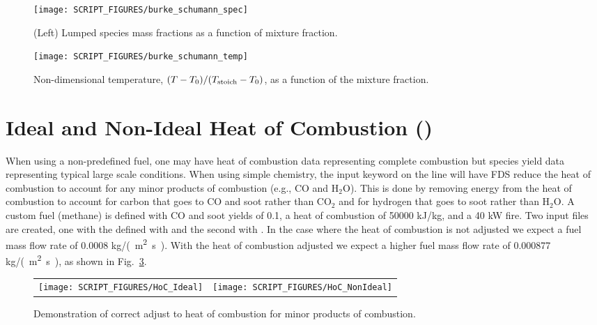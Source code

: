 \documentclass[11pt]{book}
\begin{document}
\begin{figure}[!ht]
\centering
\texttt{[image: SCRIPT\_FIGURES/burke\_schumann\_spec]}
\caption[Mixture fraction state relations for species ()]{(Left) Lumped species mass fractions as a function of mixture fraction.}
\label{fig:burke_schumann_spec}
\end{figure}

\begin{figure}[!ht]
\centering
\texttt{[image: SCRIPT\_FIGURES/burke\_schumann\_temp]}
\caption[Mixture fraction state relations for temperature ()]{Non-dimensional temperature, $(T-T_0)/(T_{\rm stoich} - T_0)$, as a function of the mixture fraction.}
\label{fig:burke_schumann_temp}
\end{figure}


\section{Ideal and Non-Ideal Heat of Combustion ()}
\label{HoC}
\label{HoC_Ideal}
\label{HoC_NonIdeal}

When using a non-predefined fuel, one may have heat of combustion data representing complete combustion but species yield data representing typical large scale conditions.  When using simple chemistry, the input keyword  on the  line will have FDS reduce the heat of combustion to account for any minor products of combustion (e.g., CO and H$_2$O).  This is done by removing energy from the heat of combustion to account for carbon that goes to CO and soot rather than CO$_2$ and for hydrogen that goes to soot rather than H$_2$O.  A custom fuel (methane) is defined with CO and soot yields of 0.1, a heat of combustion of 50000 kJ/kg, and a 40 kW fire.  Two input files are created, one with the  defined with  and the second with .  In the  case where the heat of combustion is not adjusted we expect a fuel mass flow rate of 0.0008 \si{kg/(m^2.s)}.  With the heat of combustion adjusted we expect a higher fuel mass flow rate of 0.000877 \si{kg/(m^2.s)}, as shown in Fig.~\ref{fig:HoC}.
\begin{figure}[h!]
\begin{tabular*}{\textwidth}{lr}
\texttt{[image: SCRIPT\_FIGURES/HoC\_Ideal]} &
\texttt{[image: SCRIPT\_FIGURES/HoC\_NonIdeal]}
\end{tabular*}
\caption[ and  test cases]{Demonstration of correct adjust to heat of combustion for minor products of combustion.}
\label{fig:HoC}
\end{figure}
\end{document}
